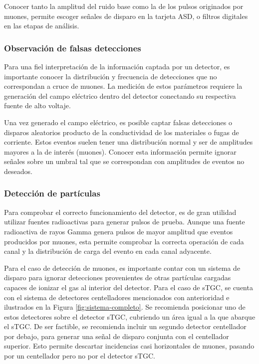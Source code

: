 		Conocer tanto la amplitud del ruido base como la de los pulsos originados por muones, permite escoger señales de disparo en la tarjeta ASD, o filtros digitales en las etapas de análisis. 
		
	\subsubsection{Observación de falsas detecciones}
		Para una fiel interpretación de la información captada por un detector, es importante conocer la distribución y frecuencia de detecciones que no correspondan a cruce de muones. La medición de estos parámetros requiere la generación del campo eléctrico dentro del detector conectando su respectiva fuente de alto voltaje.
		
		Una vez generado el campo eléctrico, es posible captar falsas detecciones o disparos aleatorios producto de la conductividad de los materiales o fugas de corriente. Estos eventos suelen tener una distribución normal y ser de amplitudes mayores a la de interés (muones). Conocer esta información permite ignorar señales sobre un umbral tal que se correspondan con amplitudes de eventos no deseados.
	
	\subsubsection{Detección de partículas}
		Para comprobar el correcto funcionamiento del detector, es de gran utilidad utilizar fuentes radioactivas para generar pulsos de prueba. Aunque una fuente radioactiva de rayos Gamma genera pulsos de mayor amplitud que eventos producidos por muones, esta permite comprobar la correcta operación de cada canal y la distribución de carga del evento en cada canal adyacente.
	
		Para el caso de detección de muones, es importante contar con un sistema de disparo para ignorar detecciones provenientes de otras partículas cargadas capaces de ionizar el gas al interior del detector. Para el caso de sTGC, se cuenta con el sistema de detectores centelladores mencionados con anterioridad e ilustrados en la Figura \ref{fig:sistema-completo}. Se recomienda posicionar uno de estos detectores sobre el detector sTGC, cubriendo un área igual a la que abarque el sTGC. De ser factible, se recomienda incluir un segundo detector centellador por debajo, para generar una señal de disparo conjunta con el centellador superior. Esto permite descartar incidencias casi horizontales de muones, pasando por un centellador pero no por el detector sTGC.
		